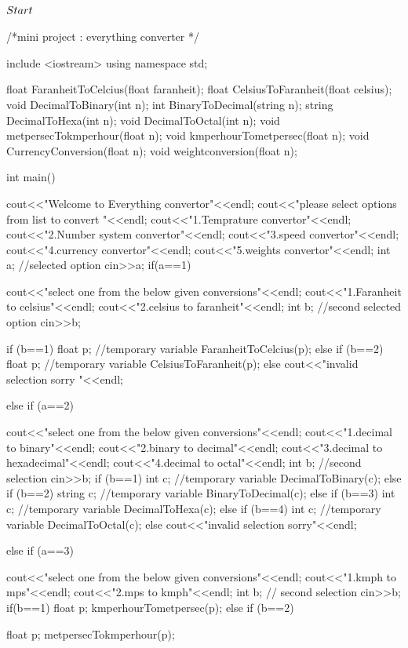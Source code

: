 \documentclass[12pt,a4paper]{article}
\begin{document}
\paragraph{$\\Start$}
 /*mini project : everything converter */

include <iostream>
using namespace std;

float FaranheitToCelcius(float faranheit);
float CelsiusToFaranheit(float celsius);
void DecimalToBinary(int n);
int BinaryToDecimal(string n);
string DecimalToHexa(int n);
void DecimalToOctal(int n);
void metpersecTokmperhour(float n);
void kmperhourTometpersec(float n);
void CurrencyConversion(float n);
void weightconversion(float n);



int main()
{
cout<<"Welcome to Everything convertor"<<endl;
cout<<"please select options from list to convert "<<endl;
cout<<"1.Temprature convertor"<<endl;
cout<<"2.Number system convertor"<<endl;
cout<<"3.speed convertor"<<endl;
cout<<"4.currency convertor"<<endl;
cout<<"5.weights convertor"<<endl;
int a;  //selected option
cin>>a;
if(a==1)

{
cout<<"select one from the below given conversions"<<endl;
cout<<"1.Faranheit to celsius"<<endl;
cout<<"2.celsius to faranheit"<<endl;
int b; //second selected option
cin>>b;

if (b==1)
{
float p;      //temporary variable
FaranheitToCelcius(p);
}
else if (b==2)
{
    float p;  //temporary variable
CelsiusToFaranheit(p);
}
else
{
cout<<"invalid selection sorry "<<endl;
}


}



else if (a==2)
{
cout<<"select one from the below given conversions"<<endl;
cout<<"1.decimal to binary"<<endl;
cout<<"2.binary to decimal"<<endl;
cout<<"3.decimal to hexadecimal"<<endl;
cout<<"4.decimal to octal"<<endl;
int b; //second selection
cin>>b;
if (b==1)
{
int c;     //temporary variable
DecimalToBinary(c);
}
else if (b==2)
{
string c;  //temporary variable
BinaryToDecimal(c);
}
else if (b==3)
{
    int c;     //temporary variable
    DecimalToHexa(c);
}
else if (b==4)
{
    int c;     //temporary variable
    DecimalToOctal(c);
}
else
{
cout<<"invalid selection sorry"<<endl;
}



}
else if (a==3)
{
cout<<"select one from the below given conversions"<<endl;
cout<<"1.kmph to mps"<<endl;
cout<<"2.mps to kmph"<<endl;
int b; // second selection
cin>>b;
if(b==1)
{
    float p;
    kmperhourTometpersec(p);
}
else if (b==2)
{
    float p;
    metpersecTokmperhour(p);

}}}
\end{document}
